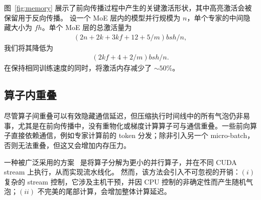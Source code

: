 图~\ref{fig:memory} 展示了前向传播过程中产生的关键激活形状，其中高亮激活会被保留用于反向传播。
设一个 MoE 层内的模型并行规模为 $n$，单个专家的中间隐藏大小为 $fh$。单个 MoE 层的总激活量为
\begin{align}
(2n+2k+3kf+12+5/m)bsh/n,
\nonumber
\end{align}
我们将其降低为
\begin{align}
(2kf+4+2/m)bsh/n.
\nonumber
\end{align}
\sysname 在保持相同训练速度的同时，将激活内存减少了 $\sim 50\%$。
 
\subsection{算子内重叠}
\label{sec:design:overlapping:intra-op}

尽管算子间重叠可以有效隐藏通信延迟，但压缩执行时间线中的所有气泡仍非易事，尤其是在前向传播中，没有重物化或梯度计算算子可与通信重叠。一些前向算子直接依赖通信，例如专家计算前的 token 分发；除非引入另一个 micro-batch，否则无法重叠，但这又会增加内存压力。

一种被广泛采用的方案~\cite{jiang2024megascale, transformer-engine, wang2022overlap} 是将算子分解为更小的并行算子，并在不同 CUDA stream 上执行，从而实现流水线化。
然而，该方法会引入不可忽视的开销：$(i)$ 复杂的 stream 控制，它涉及主机干预，并因 CPU 控制的非确定性而产生随机气泡；$(ii)$ 不完美的尾部计算，会增加整体计算延迟。

